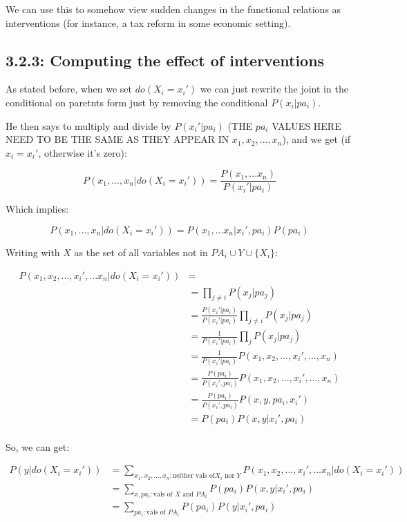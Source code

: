 We can use this to somehow view sudden changes in the functional relations as interventions (for instance, a tax reform in some economic setting).

\subsection{3.2.3: Computing the effect of interventions}

As stated before, when we set $do(X_i = x_i')$ we can just rewrite the joint in the conditional on paretnts form just by removing the conditional $P(x_i|pa_i)$. 

He then says to multiply and divide by $P(x_i'|pa_i)$ (THE $pa_i$ VALUES HERE NEED TO BE THE SAME AS THEY APPEAR IN $x_1,x_2,...,x_n$), and we get (if $x_i = x_i'$, otherwise it's zero):

$$P(x_1,...,x_n|do(X_i=x_i')) = \frac{P(x_1,...x_n)}{P(x_i'|pa_i)}$$

Which implies:

$$P(x_1,...,x_n|do(X_i=x_i')) = P(x_1,...x_n|x_i',pa_i)P(pa_i)$$

Writing with $X$ as the set of all variables not in $PA_i \cup Y \cup \{X_i\}$:

\begin{align*}
P(x_1,x_2,...,x_i',...x_n|do(X_i=x_i'))&=\\
&=\prod\limits_{j \neq i} P(x_j | pa_j)\\
&=\frac{P(x_i'|pa_i)}{P(x_i'|pa_i)}\prod\limits_{j \neq i} P(x_j | pa_j)\\
&=\frac{1}{P(x_i'|pa_i)}\prod\limits_{j} P(x_j | pa_j)\\
&=\frac{1}{P(x_i'|pa_i)}P(x_1,x_2,...,x_i',...,x_n)\\
&=\frac{P(pa_i)}{P(x_i',pa_i)}P(x_1,x_2,...,x_i',...,x_n)\\
&=\frac{P(pa_i)}{P(x_i',pa_i)}P(x,y,pa_i,x_i')\\
&=P(pa_i)P(x,y|x_i',pa_i)\\
\end{align*}

So, we can get:

\begin{align*}
P(y|do(X_i=x_i')) &= \sum\limits_{x_1,x_2,...,x_n : \text{neither vals of}X_i\text{ nor }Y}P(x_1,x_2,...,x_i',...x_n|do(X_i=x_i'))\\
&=\sum\limits_{x,pa_i:\text{vals of }X\text{ and }PA_i}P(pa_i)P(x,y|x_i',pa_i)\\
&=\sum\limits_{pa_i:\text{vals of }PA_i}P(pa_i)P(y|x_i',pa_i)\\
\end{align*}

